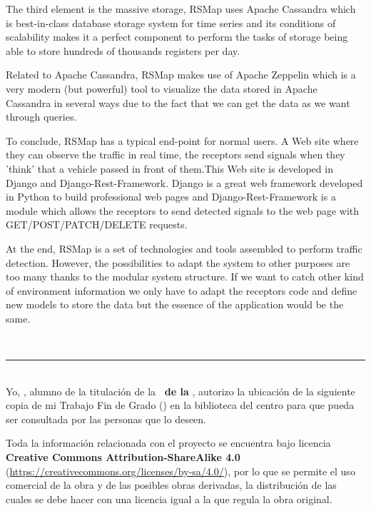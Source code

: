 {{The third element is the massive storage, RSMap uses Apache Cassandra which is best-in-class database storage system for time series and its conditions of scalability makes it a perfect component to perform the tasks of storage being able to store hundreds of thousands registers per day.

Related to Apache Cassandra, RSMap makes use of Apache Zeppelin which is a very modern (but powerful) tool to visualize the data stored in Apache Cassandra in several ways due to the fact that we can get the data as we want through queries.

To conclude, RSMap has a typical end-point for normal users. A Web site where they can observe the traffic in real time, the receptors send signals when they 'think' that a vehicle passed in front of them.This Web site is developed in Django and Django-Rest-Framework. Django is a great web framework developed in Python to build professional web pages and Django-Rest-Framework is a module which allows the receptors to send detected signals to the web page with GET/POST/PATCH/DELETE requests.


\bigskip
At the end, RSMap is a set of technologies and tools assembled to perform traffic detection. However, the possibilities to adapt the system to other purposes are too many thanks to the modular system structure. If we want to catch other kind of environment information we only have to adapt the receptors code and define new models to store the data but the essence of the application would be the same.

\newpage
\thispagestyle{empty}
\
\vspace{3cm}

\noindent\rule[-1ex]{\textwidth}{2pt}\\[4.5ex]

Yo, \textbf{\autor}, alumno de la titulación \textbf{\grado} de la \textbf{\escuela\ de la \universidad}, autorizo la ubicación de la siguiente copia de mi Trabajo Fin de Grado (\textit{\titulo}) en la biblioteca del centro para que pueda ser consultada por las personas que lo deseen.

\bigskip
Toda la información relacionada con el proyecto se encuentra bajo licencia \textbf{Creative Commons Attribution-ShareAlike 4.0} (\url{https://creativecommons.org/licenses/by-sa/4.0/}), por lo que se permite el uso comercial de la obra y de las posibles obras derivadas, la distribución de las cuales se debe hacer con una licencia igual a la que regula la obra original.

}}
